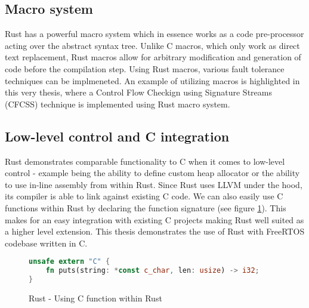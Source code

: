 \subsection{Macro system}
Rust has a powerful macro system which in essence works as a code pre-processor acting over the abstract syntax tree. Unlike C macros, which only work as direct text replacement, Rust macros allow for arbitrary modification and generation of code before the compilation step. Using Rust macros, various fault tolerance techniques can be implmeneted. An example of utilizing macros is highlighted in this very thesis, where a Control Flow Checkign using Signature Streams (CFCSS) technique is implemented using Rust macro system. 

\subsection{Low-level control and C integration}
Rust demonstrates comparable functionality to C when it comes to low-level control - example being the ability to define custom heap allocator or the ability to use in-line assembly from within Rust. Since Rust uses LLVM under the hood, its compiler is able to link against existing C code. We can also easily use C functions within Rust by declaring the function signature (see figure \ref{fig:rust_extern}). This makes for an easy integration with existing C projects making Rust well suited as a higher level extension. This thesis demonstrates the use of Rust with FreeRTOS codebase written in C.

\begin{figure}[!h]
\begin{lstlisting}[language=Rust]
unsafe extern "C" {
    fn puts(string: *const c_char, len: usize) -> i32;
}
\end{lstlisting}
\caption{Rust - Using C function within Rust}
\label{fig:rust_extern}
\end{figure}
